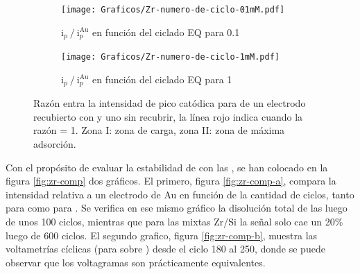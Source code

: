 			     	\begin{figure}[bh!]
			   	    \begin{subfigure}[t]{0.495\textwidth}
			        	\texttt{[image: Graficos/Zr-numero-de-ciclo-01mM.pdf]}
			        	\vspace*{-10mm}\caption{$\text{i}_p\mathbin{/}\text{i}_p^{\text{Au}}$ en función del ciclado EQ para \ru\space \SI{0.1}{\milli\Molar}}
			         	\end{subfigure}
			     		 \begin{subfigure}[t]{0.495\textwidth}
			        	\texttt{[image: Graficos/Zr-numero-de-ciclo-1mM.pdf]}
			        	\vspace*{-10mm}\caption{$\text{i}_p\mathbin{/}\text{i}_p^{\text{Au}}$ en función del ciclado EQ para \ru\space \SI{1}{\milli\Molar}}
			         	\end{subfigure}
			         	\caption[Intensidad en función del ciclado EQ para \pdmZ]{Razón entra la intensidad de pico catódica para \ru\space de un electrodo recubierto con \pdmZ\space y uno sin recubrir, la línea rojo indica cuando la razón = 1. Zona I: zona de carga, zona II: zona de máxima adsorción.}
			         	\label{fig:ventana-zr}
			     	\end{figure}

		 Con el propósito de evaluar la estabilidad de \pdmZ\space con las \pdmF, se han colocado en la figura \ref{fig:zr-comp} dos gráficos. El primero, figura \ref{fig:zr-comp-a}, compara la intensidad relativa a un electrodo de Au en función de la cantidad de ciclos, tanto para \pdmZ\space como para \pdmF. Se verifica en ese mismo gráfico la disolución total de las \pdmF\space luego de unos 100 ciclos, mientras que para las mixtas Zr/Si la señal solo cae un 20\% luego de 600 ciclos. El segundo grafico, figura \ref{fig:zr-comp-b}, muestra las voltametrías cíclicas (para \ru\space sobre \pdmZ) desde el ciclo 180 al 250, donde se puede observar que los voltagramas son prácticamente equivalentes.
		 			
